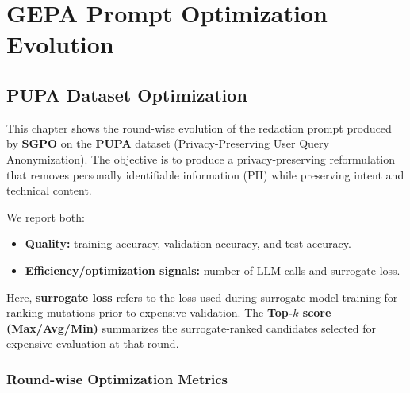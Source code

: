 \chapter{GEPA Prompt Optimization Evolution}
\label{ch:prompt_evolution}

\section{PUPA Dataset Optimization}
This chapter shows the round-wise evolution of the redaction prompt produced by \textbf{SGPO} on the \textbf{PUPA} dataset (Privacy-Preserving User Query Anonymization). The objective is to produce a privacy-preserving reformulation that removes personally identifiable information (PII) while preserving intent and technical content.

We report both:
\begin{itemize}
    \item \textbf{Quality:} training accuracy, validation accuracy, and test accuracy.
    \item \textbf{Efficiency/optimization signals:} number of LLM calls and surrogate loss.
\end{itemize}
Here, \textbf{surrogate loss} refers to the loss used during surrogate model training for ranking mutations prior to expensive validation. The \textbf{Top-$k$ score (Max/Avg/Min)} summarizes the surrogate-ranked candidates selected for expensive evaluation at that round.

\subsection{Round-wise Optimization Metrics}
\begin{table}[H]
\centering
\small
\caption{SGPO optimization metrics across rounds (\textit{PUPA}).}
\label{tab:pupa_bandit_metrics}
\end{table}

